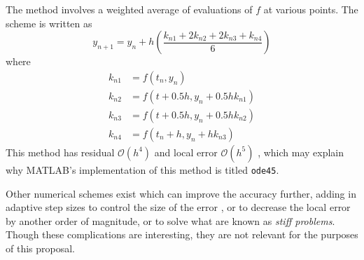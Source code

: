 The method involves a weighted average of evaluations of $ f $ at various points.  The scheme is written as 
%
\begin{equation}\label{RK}
	y_{n+1} = y_n + h \left( \dfrac{k_{n1} + 2k_{n2} + 2k_{n3} + k_{n4}}{6}\right)
\end{equation}
%
where
\begin{align*}
	k_{n1} &= f(t_n, y_n) \\
	k_{n2} &= f(t+0.5h, y_n + 0.5hk_{n1}) \\
	k_{n3} &= f(t + 0.5h, y_n + 0.5hk_{n2})\\
	k_{n4} &= f(t_n + h, y_n + hk_{n3})
\end{align*}
%
This method has residual $ \mathcal{O}(h^4) $ and local error $ \mathcal{O}(h^5) $ \cite{boyce2012differential}, which may explain why MATLAB's implementation of this method is titled \verb|ode45|. 

Other numerical schemes exist which can improve the accuracy further, adding in adaptive step sizes to control the size of the error \cite{corless2013graduate}, or to decrease the local error by another order of magnitude, or to solve what are known as \textit{stiff problems}.  Though these complications are interesting, they are not relevant for the purposes of this proposal.